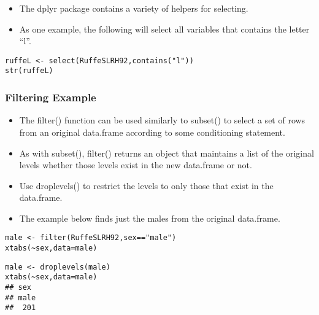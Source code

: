 \begin{frame}[verbatim]
\begin{itemize}
\item 
The dplyr package contains a variety of helpers for selecting. 
\item As one example, the following will select all variables that contains the letter “l”.
\end{itemize}
\begin{framed}
\begin{verbatim}
ruffeL <- select(RuffeSLRH92,contains("l"))
str(ruffeL)
\end{verbatim}
\end{framed}

\end{frame}
\begin{frame}
\frametitle{Filtering Example}
\begin{itemize}
\item The filter() function can be used similarly to subset() to select a set of rows from an original data.frame according to some 
conditioning statement. 
\item As with subset(), filter() returns an object that maintains a list of the original levels whether those levels exist in the new data.frame or not.
\item  Use droplevels() to restrict the levels to only those that exist in the data.frame. 
\item The example below finds just the males from the original data.frame.
\end{itemize}
\begin{framed}
\begin{verbatim}male <- filter(RuffeSLRH92,sex=="male")
xtabs(~sex,data=male)
\end{verbatim}
\end{framed}

\end{frame}
\begin{frame}[fragile]

\begin{framed}
\begin{verbatim}
male <- droplevels(male)
xtabs(~sex,data=male)
## sex
## male 
##  201
\end{verbatim}
\end{framed}
\end{frame}
